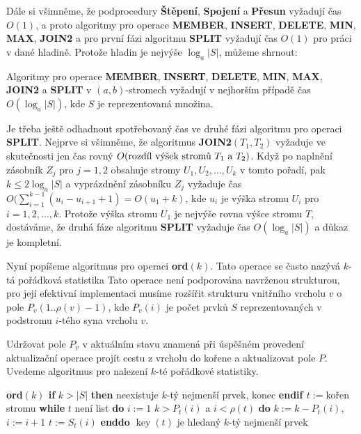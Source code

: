 \documentclass[a4paper,12pt]{article}
\DeclareMathOperator*{\key}{key}
\begin{document}
Dále si všimněme, že podprocedury {\bf Štěpení}, {\bf Spojení} a {\bf Pře\-sun }
vyžadují čas $O(1)$, a proto algoritmy pro operace {\bf MEMBER}, 
{\bf INSERT}, {\bf DELETE}, {\bf MIN}, {\bf MAX}, {\bf JOIN2} a pro první fázi algoritmu 
{\bf SPLIT} vyžadují čas $O(1)$ pro práci v dané hladině.  Protože 
hladin je nejvýše $\log_a|S|$, můžeme shrnout: 

Algoritmy pro operace {\bf MEMBER}, {\bf INSERT}, 
{\bf DE\-LETE}, {\bf MIN}, {\bf MAX}, {\bf JOIN2} a {\bf SPLIT} v $
(a,b)$-stromech vy\-žadují 
v nejhorším případě čas $O(\log_a|S|)$, kde $
S$ je 
re\-pre\-zen\-tovaná množina.  
\endproclaim

Je třeba ještě odhadnout spotřebovaný čas ve druhé fázi 
algoritmu pro operaci {\bf SPLIT}. Nejprve si všimněme, že 
algoritmus {\bf JOIN2$(T_1,T_2)$} vyžaduje ve skutečnosti jen čas 
rovný 
$O(\text{\rm rozdíl výšek stromů }T_1\text{\rm \ a }
T_2)$. Když po naplnění 
zásobník $Z_j$ pro $j=1,2$ obsahuje stromy $U_1,U_2,\dots,U_
k$ v tomto 
pořadí, pak $k\le 2\log_a|S|$ a vyprázdnění zásobníku $
Z_j$ 
vyžaduje 
čas $O(\sum_{i=1}^{k-1}(u_i-u_{i+1}+1)=O(u_1+k)$, kde $u_i$ je výška stromu $
U_i$ pro 
$i=1,2,\dots,k$. Protože výška stromu $U_1$ je nejvýše rovna výšce 
stromu $T$, dostáváme, že druhá fáze algoritmu {\bf SPLIT} vyžaduje 
čas $O(\log_a|S|)$ a důkaz je kompletní. 

Nyní popíšeme algoritmus pro operaci {\bf ord$
(k)$}. Tato 
operace se často nazývá $k$-tá pořádko\-vá statistika
Tato operace není podporována navrženou 
strukturou, pro její efektivní implementaci musíme 
rozšířit strukturu vnitřního vrcholu $v$ o pole\newline 
$P_v(1..\rho (v)-1)$, kde $P_v(i)$ je počet prvků $S$ reprezentovaných 
v podstromu $i$-tého syna vrcholu $v$.

 

Udržovat pole $P_v$ v aktuálním stavu znamená při úspěšném 
pro\-vedení aktualizační operace projít cestu z vrcholu do koře\-ne 
a aktualizovat pole $P$. Uvedeme algoritmus pro 
naleze\-ní $k$-té pořádkové statistiky.

{\bf ord$(k)$\newline 
if} $k>|S|$ {\bf then} neexistuje $k$-tý nejmenší prvek, konec 
{\bf endif\newline 
$t:=$}kořen stromu\newline 
{\bf while} $t$ není list {\bf do}\newline 
\phantom{---}$i:=1$\newline 
\phantom{---}{\bf while} $k>P_t(i)$ a $i<\rho (t)$ {\bf do}\newline 
\phantom{------}$k:=k-P_t(i)$, $i:=i+1$\newline 
\phantom{---}{\bf enddo}\newline 
\phantom{---}$t:=S_t(i)$\newline 
{\bf enddo}\newline 
$\key(t)$ je hledaný $k$-tý nejmenší prvek
\end{document}
